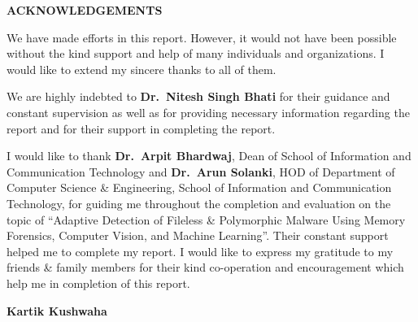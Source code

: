 \begin{center}
	\Huge\uppercase{\textbf{Acknowledgements}}
\end{center}
{
\setlength{\baselineskip}{25pt}

We have made efforts in this report. However, it would not have been possible without the
kind support and help of many individuals and organizations. I would like to extend my
sincere thanks to all of them.

We are highly indebted to \textbf{Dr.~Nitesh Singh Bhati} for their guidance and constant
supervision as well as for providing necessary information regarding the report and for
their support in completing the report.

I would like to thank \textbf{Dr.~Arpit Bhardwaj}, Dean of School of Information
and Communication Technology and \textbf{Dr.~Arun Solanki}, HOD of Department of Computer Science \&
Engineering, School of Information and Communication Technology, for guiding me
throughout the completion and evaluation on the topic of “Adaptive Detection of Fileless \& Polymorphic Malware Using Memory Forensics, Computer Vision, and Machine Learning”. Their constant
support helped me to complete my report. I would like to express my gratitude to my
friends \& family members for their kind co-operation and encouragement which help me
in completion of this report.

\vspace{1cm}

\hfill \textbf{Kartik Kushwaha}  %

}
\clearpage
